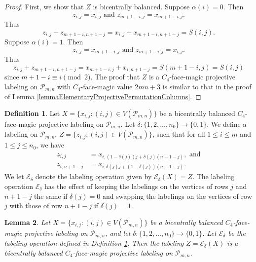\documentclass[12pt]{amsart}
\theoremstyle{definition}
\newtheorem{definition}{Definition}
\theoremstyle{plain}
\newtheorem{lemma}[definition]{Lemma}
\begin{document}
\begin{proof}
  First, we show that $Z$ is bicentrally balanced.
  Suppose $\alpha(i)=0$. Then
  \begin{equation*}
    z_{i,j} = x_{i,j} \mbox{ \ \ and \ \ } z_{m+1-i,j} = x_{m+1-i,j}.
  \end{equation*}
  Thus
  \begin{equation*}
    z_{i,j} +  z_{m+1-i,n+1-j} =  x_{i,j} +  x_{m+1-i,n+1-j} = S(i,j).
  \end{equation*}
  Suppose $\alpha(i)=1$. Then
  \begin{equation*}
    z_{i,j} = x_{m+1-i,j} \mbox{ \ \ and \ \ } z_{m+1-i,j} = x_{i,j}.
  \end{equation*}
  Thus
  \begin{equation*}
    z_{i,j} +  z_{m+1-i,n+1-j} =  x_{m+1-i,j} +  x_{i,n+1-j} = S(m+1-i,j) =S(i,j)
  \end{equation*}
  since $m+1-i \equiv i \pmod{2}$.
  The proof that $Z$ is a $C_4$-face-magic projective labeling on $\mathcal{P}_{m,n}$ with $C_4$-face-magic value $2mn+3$ is similar to
  that in the proof of Lemma \ref{lemmaElementaryProjectivePermutationColumns}.
\end{proof}

\begin{definition} \label{defnElementaryProjectiveSwapRows}
  Let $X=\{x_{i,j}:(i,j)\in V(\mathcal{P}_{m,n})\}$ be a bicentrally balanced $C_4$-face-magic projective labeling on $\mathcal{P}_{m,n}$.
  Let $\delta: \{1,2,\ldots,n_0\}\rightarrow \{0,1\}$.
  We define a labeling on $\mathcal{P}_{m,n}$, $Z=\{z_{i,j}:(i,j)\in V(\mathcal{P}_{m,n})\}$,
  such that for all $1 \leqslant i \leqslant m$ and $1 \leqslant j \leqslant n_0$, we have
    \begin{align*}
      z_{i,j} &= x_{i, (1-\delta(j))j +\delta(j)(n+1-j)}, \mbox{ \ \ and} \\
      z_{i,n+1-j} &= x_{i,\delta(j)j + (1- \delta(j)) (n+1-j)}.
    \end{align*}
    We let $\mathcal{E}_{\delta}$ denote the labeling operation given by $\mathcal{E}_{\delta}(X)=Z$.
    The labeling operation $\mathcal{E}_{\delta}$ has the effect of keeping the labelings on the vertices of rows $j$ and $n+1-j$ the same if $\delta(j)=0$ and
    swapping the labelings on the vertices of row $j$ with those of row $n+1-j$ if $\delta(j)=1$.
\end{definition}

\begin{lemma}  \label{lemmaElementaryProjectiveSwapRows}
  Let $X=\{x_{i,j}:(i,j)\in V(\mathcal{P}_{m,n})\}$ be a bicentrally balanced $C_4$-face-magic projective labeling on $\mathcal{P}_{m,n}$, and
  let $\delta: \{1,2,\ldots,n_0\}\rightarrow \{0,1\}$.
  Let $\mathcal{E}_{\delta}$ be the labeling operation defined in Definition \ref{defnElementaryProjectiveSwapRows}.
  Then the labeling $Z=\mathcal{E}_{\delta}(X)$ is a bicentrally balanced $C_4$-face-magic projective labeling on $\mathcal{P}_{m,n}$.
\end{lemma}
\end{document}
